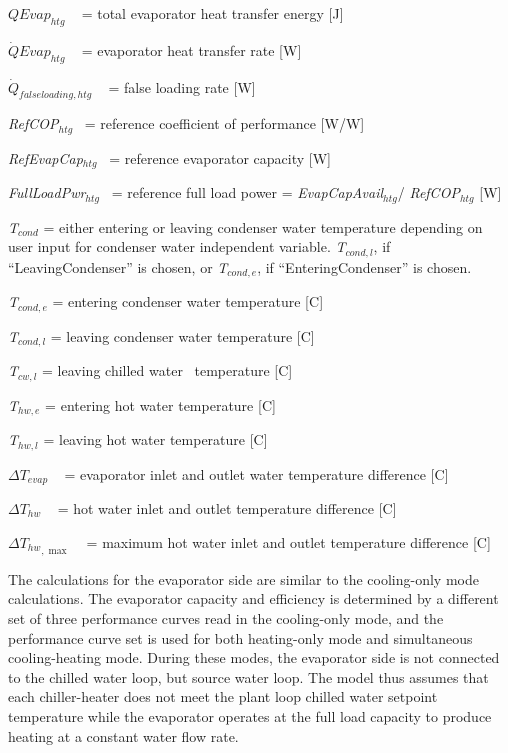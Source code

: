 \(QEva{p_{htg}}\) ~ = total evaporator heat transfer energy {[}J{]}

\(\dot QEva{p_{htg}}\) ~ = evaporator heat transfer rate {[}W{]}

\({\dot Q_{falseloading,htg}}\) ~ = false loading rate {[}W{]}

\emph{RefCOP\(_{htg}\)}~ = reference coefficient of performance {[}W/W{]}

\emph{RefEvapCap\(_{htg}\)}~ = reference evaporator capacity {[}W{]}

\emph{FullLoadPwr\(_{htg}\)}~ = reference full load power = \emph{EvapCapAvail\(_{htg}\)}/ \emph{RefCOP\(_{htg}\)} {[}W{]}

\emph{T\(_{cond}\)} = either entering or leaving condenser water temperature depending on user input for condenser water independent variable. \emph{T\(_{cond,l}\)}, if ``LeavingCondenser'' is chosen, or \emph{T\(_{cond,e}\)}, if ``EnteringCondenser'' is chosen.

\emph{T\(_{cond,e}\)} = entering condenser water temperature {[}C{]}

\emph{T\(_{cond,l}\)} = leaving condenser water temperature {[}C{]}

\emph{T\(_{cw,l}\)} = leaving chilled water~ temperature {[}C{]}

\emph{T\(_{hw,e}\)} = entering hot water temperature {[}C{]}

\emph{T\(_{hw,l}\)} = leaving hot water temperature {[}C{]}

\(\Delta {T_{evap}}\) ~ = evaporator inlet and outlet water temperature difference {[}C{]}

\(\Delta {T_{hw}}\) ~ = hot water inlet and outlet temperature difference {[}C{]}

\(\Delta {T_{hw}}_{,\max }\) ~ = maximum hot water inlet and outlet temperature difference {[}C{]}

The calculations for the evaporator side are similar to the cooling-only mode calculations. The evaporator capacity and efficiency is determined by a different set of three performance curves read in the cooling-only mode, and the performance curve set is used for both heating-only mode and simultaneous cooling-heating mode. During these modes, the evaporator side is not connected to the chilled water loop, but source water loop. The model thus assumes that each chiller-heater does not meet the plant loop chilled water setpoint temperature while the evaporator operates at the full load capacity to produce heating at a constant water flow rate.

